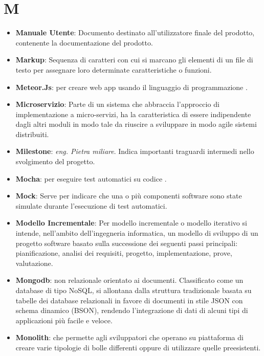 \section*{M}
\begin{itemize}
	\item
	\textbf{Manuale Utente}: Documento destinato all'utilizzatore finale del prodotto, contenente la documentazione del prodotto.
	\item
	\textbf{Markup}: Sequenza di caratteri con cui si marcano gli elementi di un file di testo per assegnare loro determinate caratteristiche o funzioni.
	\item
	\textbf{Meteor.Js}:  per creare web app usando il linguaggio di programmazione .
	\item
	\textbf{Microservizio}: Parte di un sistema che abbraccia l'approccio di implementazione a micro-servizi, ha la caratteristica di essere indipendente dagli altri moduli in modo tale da riuscire a sviluppare in modo agile sistemi distribuiti.
	\item
	\textbf{Milestone}: \textit{eng. Pietra miliare}. Indica importanti traguardi intermedi nello svolgimento del progetto.
	\item
	\textbf{Mocha}:  per eseguire test automatici su codice .
	\item
	\textbf{Mock}: Serve per indicare che una o più componenti software sono state simulate durante l'esecuzione di test automatici.
	\item
	\textbf{Modello Incrementale}: Per modello incrementale o modello iterativo si intende, nell'ambito dell'ingegneria informatica, un modello di sviluppo di un progetto software basato sulla successione dei seguenti passi principali: pianificazione, analisi dei requisiti, progetto, implementazione, prove, valutazione.
	\item
	\textbf{Mongodb}:  non relazionale orientato ai documenti. Classificato come un database di tipo NoSQL,  si allontana dalla struttura tradizionale basata su tabelle dei database relazionali in favore di documenti in stile JSON con schema dinamico (BSON), rendendo l'integrazione di dati di alcuni tipi di applicazioni più facile e veloce.
	\item
	\textbf{Monolith}:  che permette agli sviluppatori che operano su piattaforma  di creare varie tipologie di bolle differenti oppure di utilizzare quelle preesistenti.
\end{itemize}
\newpage